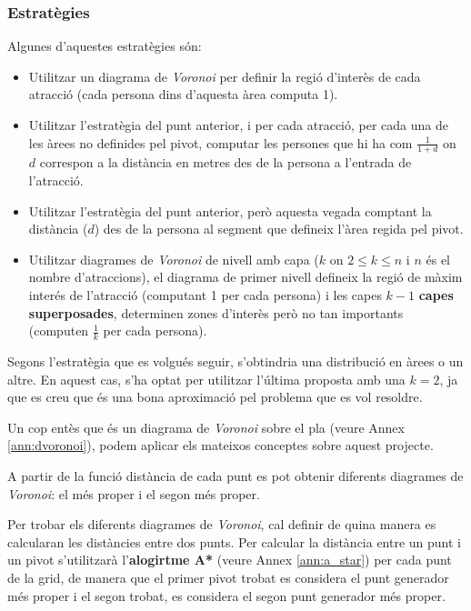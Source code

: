 \documentclass[12pt]{article}
\begin{document}
\subsubsection{Estratègies}
Algunes d'aquestes estratègies són:
\begin{itemize}
	\item Utilitzar un diagrama de \textit{Voronoi} per definir la regió d'interès de cada atracció (cada persona dins d'aquesta àrea computa 1).
	\item Utilitzar l'estratègia del punt anterior, i per cada atracció, per cada una de les àrees no definides pel pivot, computar les persones que hi ha com $\frac{1}{1+d}$ on $d$ correspon a la distància en metres des de la persona a l'entrada de l'atracció.
	\item Utilitzar l'estratègia del punt anterior, però aquesta vegada comptant la distància ($d$) des de la persona al segment que defineix l'àrea regida pel pivot.
	\item Utilitzar diagrames de \textit{Voronoi} de nivell amb capa ($k$ on $2 \le k \le n$ i $n$ és el nombre d'atraccions), el diagrama de primer nivell defineix la regió de màxim interés de l'atracció (computant 1 per cada persona) i les capes $k-1$ \textbf{capes superposades}, determinen zones d'interès però no tan importants (computen $\frac{1}{k}$ per cada persona).
\end{itemize}

Segons l'estratègia que es volgués seguir, s'obtindria una distribució en àrees o un altre. En aquest cas, s'ha optat per utilitzar l'última proposta amb una $k = 2$, ja que es creu que és una bona aproximació pel problema que es vol resoldre. 

Un cop entès que és un diagrama de \textit{Voronoi} sobre el pla (veure Annex \ref{ann:dvoronoi}), podem aplicar els mateixos conceptes sobre aquest projecte. 

A partir de la funció distància de cada punt es pot obtenir diferents diagrames de \textit{Voronoi}: el més proper i el segon més proper. 

Per trobar els diferents diagrames de \textit{Voronoi}, cal definir de quina manera es calcularan les distàncies entre dos punts. Per calcular la distància entre un punt i un pivot s'utilitzarà l'\textbf{alogirtme A*} (veure Annex \ref{ann:a_star}) per cada punt de la grid, de manera que el primer pivot trobat es considera el punt generador més proper i el segon trobat, es considera el segon punt generador més proper.
\end{document}
